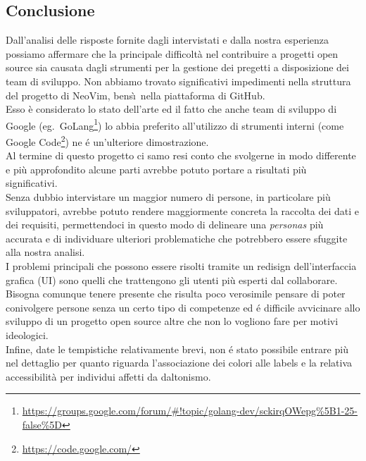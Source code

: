 \documentclass[12pt]{article} %
\begin{document}
\subsection{Conclusione}
Dall'analisi delle risposte fornite dagli intervistati e dalla nostra esperienza possiamo affermare che la principale difficolt\`a nel contribuire a progetti open source sia causata dagli strumenti per la gestione dei pregetti a disposizione dei team di sviluppo. Non abbiamo trovato significativi impedimenti nella struttura del progetto di NeoVim, bens\`\i\ nella piattaforma di GitHub.\\
Esso \`e considerato lo stato dell'arte ed il fatto che anche team di sviluppo di Google (eg.\ GoLang\footnote{\url{https://groups.google.com/forum/#!topic/golang-dev/sckirqOWepg\%5B1-25-false\%5D}}) lo abbia preferito all'utilizzo di strumenti interni (come Google Code\footnote{\url{https://code.google.com/}}) ne \'e un'ulteriore dimostrazione.\\
Al termine di questo progetto ci samo resi conto che svolgerne in modo differente e pi\`u approfondito alcune parti avrebbe potuto portare a risultati pi\`u significativi.\\
Senza dubbio intervistare un maggior numero di persone, in particolare pi\`u sviluppatori, avrebbe potuto rendere maggiormente concreta la raccolta dei dati e dei requisiti, permettendoci in questo modo di delineare una \emph{personas} pi\`u accurata e di individuare ulteriori problematiche che potrebbero essere sfuggite alla nostra analisi.\\
I problemi principali che possono essere risolti tramite un redisign dell'interfaccia grafica (UI) sono quelli che trattengono gli utenti pi\`u esperti dal collaborare. Bisogna comunque tenere presente che risulta poco verosimile pensare di poter conivolgere persone senza un certo tipo di competenze ed \'e difficile avvicinare allo sviluppo di un progetto open source altre che non lo vogliono fare per motivi ideologici.\\
Infine, date le tempistiche relativamente brevi, non \'e stato possibile entrare pi\`u nel dettaglio per quanto riguarda l'associazione dei colori alle labels e la relativa accessibilit\`a per individui affetti da daltonismo.


\newpage


\end{document}
